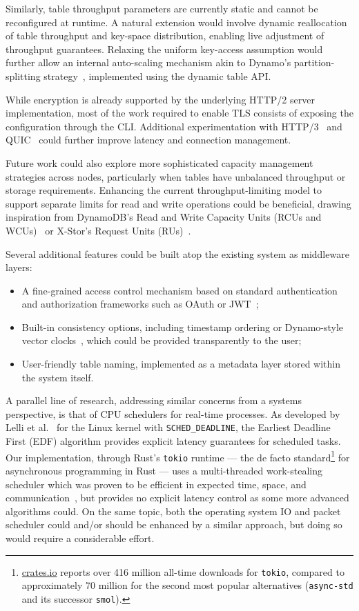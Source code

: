 Similarly, table throughput parameters are currently static and cannot be reconfigured at runtime.
A natural extension would involve dynamic reallocation of table throughput and key-space distribution,
enabling live adjustment of throughput guarantees.
Relaxing the uniform key-access assumption would further allow
an internal auto-scaling mechanism akin to Dynamo's partition-splitting strategy~\cite{Dynamo2007},
implemented using the dynamic table API\@.

While encryption is already supported by the underlying HTTP/2 server implementation,
most of the work required to enable TLS consists of exposing the configuration through the CLI\@.
Additional experimentation with HTTP/3~\cite{HTTP3} and QUIC~\cite{QUIC} could further improve latency and connection management.

Future work could also explore more sophisticated capacity management strategies across nodes,
particularly when tables have unbalanced throughput or storage requirements.
Enhancing the current throughput-limiting model to support separate limits for read and write operations
could be beneficial, drawing inspiration from DynamoDB's Read and Write Capacity Units (RCUs and WCUs)~\cite{Dynamo2022, DynamoWhitepaper}
or X-Stor's Request Units (RUs)~\cite{XStor}.

Several additional features could be built atop the existing system as middleware layers:
\begin{itemize}
    \item A fine-grained access control mechanism based on standard authentication and authorization frameworks such as OAuth or JWT~\cite{OAuth2, JWT};
    \item Built-in consistency options, including timestamp ordering or Dynamo-style vector clocks~\cite{Dynamo2007}, which could be provided transparently to the user;
    \item User-friendly table naming, implemented as a metadata layer stored within the system itself.
\end{itemize}

A parallel line of research, addressing similar concerns from a systems perspective, is that of CPU schedulers for real-time processes.
As developed by Lelli et al.~\cite{Deadline} for the Linux kernel with \texttt{SCHED\_DEADLINE},
the Earliest Deadline First (EDF) algorithm provides explicit latency guarantees for scheduled tasks.
Our implementation, through Rust's \texttt{tokio} runtime --- the de facto standard\footnote{
    \href{https://crates.io}{crates.io} reports over 416 million all-time downloads for \texttt{tokio},
    compared to approximately 70 million for the second most popular alternatives (\texttt{async-std} and its successor \texttt{smol}).
} for asynchronous programming in Rust --- uses a multi-threaded work-stealing scheduler
which was proven to be efficient in expected time, space, and communication~\cite{WorkStealingScheduler},
but provides no explicit latency control as some more advanced algorithms could.
On the same topic, both the operating system IO and packet scheduler could and/or should be enhanced by a similar approach,
but doing so would require a considerable effort.

